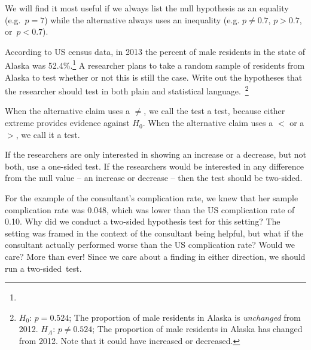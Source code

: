 \begin{tipBox}{
We will find it most useful if we always list the null hypothesis as an equality (e.g.~$p = 7$) while the alternative always uses an inequality (e.g. $p \neq 0.7$, $p>0.7$, or~$p<0.7$).}
\end{tipBox}

\begin{exercise}
According to US census data, in 2013 the percent of male residents in the state of Alaska was 52.4\%.\footnote{} A researcher plans to take a random sample of residents from Alaska to test whether or not this is still the case. Write out the hypotheses that the researcher should test in both plain and statistical language.~\footnote{$H_0$: $p=0.524$; The proportion of male residents in Alaska is \emph{unchanged} from 2012. $H_A$: $p \neq 0.524$; The proportion of male residents in Alaska has changed from 2012. Note that it could have increased or decreased.}
\end{exercise}

When the alternative claim uses a $\neq$, we call the test a  test, because either extreme provides evidence against $H_0$. When the alternative claim uses a $<$ or a $>$, we call it a  test.

\begin{tipBox}{
If the researchers are only interested in showing an increase or a decrease, but not both, use a one-sided test. If the researchers would be interested in any difference from the null value -- an increase or decrease -- then the test should be two-sided.\vspace{0.5mm}}
\end{tipBox}

\begin{example}{For the example of the consultant's complication rate, we knew that her sample complication rate was 0.048, which was lower than the US complication rate of 0.10. Why did we conduct a two-sided hypothesis test for this setting?}
The setting was framed in the context of the consultant being helpful, but what if the consultant actually performed worse than the US complication rate? Would we care? More than ever! Since we care about a finding in either direction, we should run a two-sided~test.
\end{example}

